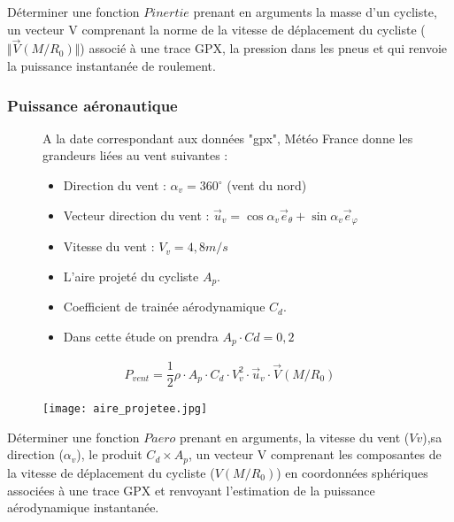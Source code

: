 \question{} Déterminer une fonction $Pinertie$ prenant en arguments la masse d'un cycliste, un vecteur V comprenant la norme de la vitesse de déplacement du cycliste ($\Vert \overrightarrow{V}(M/R_0)\Vert$) associé à une trace GPX, la pression dans les pneus et qui renvoie la puissance instantanée de roulement.

\subsubsection{Puissance aéronautique}


\begin{figure}[!htb]
\begin{minipage}{0.5\textwidth}
A la date correspondant aux données "gpx", Météo France donne les grandeurs liées au vent suivantes :
\begin{itemize}
\item Direction du vent : $\alpha_v=360^{\circ}$ (vent du nord)
\item Vecteur direction du vent : $\overrightarrow{u}_v=\cos\alpha_v\overrightarrow{e}_{\theta}+\sin\alpha_v\overrightarrow{e}_{\varphi}$
\item Vitesse du vent : $V_v=4,8m/s$
\item L'aire projeté du cycliste $A_p$.
\item Coefficient de trainée aérodynamique $C_d$.
\item Dans cette étude on prendra $A_p\cdot Cd=0,2$
\end{itemize}

\begin{align*}
P_{vent}=\dfrac{1}{2}\rho\cdot A_p\cdot C_d\cdot V_v^2\cdot \overrightarrow{u}_v\cdot \overrightarrow{V}(M/R_0)
\end{align*}
\end{minipage}
\begin{minipage}{0.5\textwidth}
\begin{center}
\texttt{[image: aire\_projetee.jpg]}
\end{center}
\end{minipage}
\end{figure}


\question{} Déterminer une fonction $Paero$ prenant en arguments, la vitesse du vent ($Vv$),sa direction ($\alpha_v$), le produit $C_d\times A_p$, un vecteur V comprenant les composantes de la vitesse de déplacement du cycliste ($V(M/R_0)$) en coordonnées sphériques associées à une trace GPX et renvoyant l'estimation de la puissance aérodynamique instantanée.  

